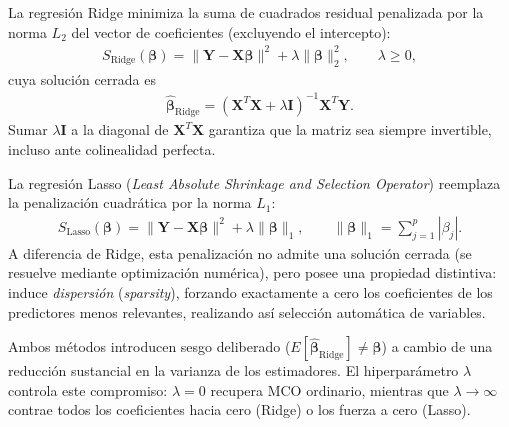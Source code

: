 \begin{definicion}
	La regresión Ridge minimiza la suma de cuadrados residual penalizada por la norma $L_2$ del vector de coeficientes (excluyendo el intercepto):
	\begin{align}
		S_{\text{Ridge}}(\boldsymbol{\beta}) = \|\mathbf{Y}-\mathbf{X}\boldsymbol{\beta}\|^2 + \lambda\|\boldsymbol{\beta}\|_2^2, \qquad \lambda\geq0,
	\end{align}
	cuya solución cerrada es
	\begin{align}
		\hat{\boldsymbol{\beta}}_{\text{Ridge}} = (\mathbf{X}^T\mathbf{X}+\lambda\mathbf{I})^{-1}\mathbf{X}^T\mathbf{Y}.
	\end{align}
	Sumar $\lambda\mathbf{I}$ a la diagonal de $\mathbf{X}^T\mathbf{X}$ garantiza que la matriz sea siempre invertible, incluso ante colinealidad perfecta.
\end{definicion}

\begin{definicion}
	La regresión Lasso (\emph{Least Absolute Shrinkage and Selection Operator}) reemplaza la penalización cuadrática por la norma $L_1$:
	\begin{align}
		S_{\text{Lasso}}(\boldsymbol{\beta}) = \|\mathbf{Y}-\mathbf{X}\boldsymbol{\beta}\|^2 + \lambda\|\boldsymbol{\beta}\|_1, \qquad \|\boldsymbol{\beta}\|_1=\sum_{j=1}^p|\beta_j|.
	\end{align}
	A diferencia de Ridge, esta penalización no admite una solución cerrada (se resuelve mediante optimización numérica), pero posee una propiedad distintiva: induce \emph{dispersión} (\emph{sparsity}), forzando exactamente a cero los coeficientes de los predictores menos relevantes, realizando así selección automática de variables.
\end{definicion}

\begin{observacion}
	Ambos métodos introducen sesgo deliberado ($E[\hat{\boldsymbol{\beta}}_{\text{Ridge}}]\neq\boldsymbol{\beta}$) a cambio de una reducción sustancial en la varianza de los estimadores. El hiperparámetro $\lambda$ controla este compromiso: $\lambda=0$ recupera MCO ordinario, mientras que $\lambda\to\infty$ contrae todos los coeficientes hacia cero (Ridge) o los fuerza a cero (Lasso).
\end{observacion}

